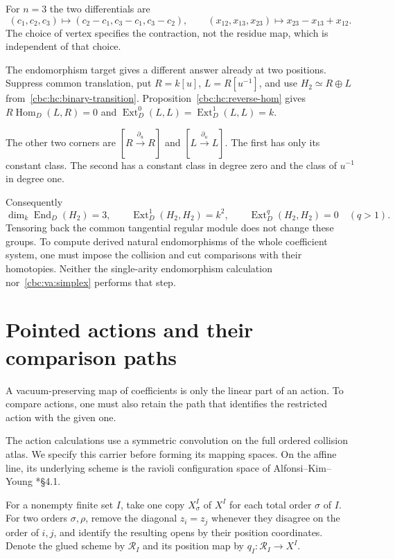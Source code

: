For $n=3$ the two differentials are
\[
 (c_1,c_2,c_3)\longmapsto(c_2-c_1,c_3-c_1,c_3-c_2),
 \qquad
 (x_{12},x_{13},x_{23})\longmapsto x_{23}-x_{13}+x_{12}.
\]
The choice of vertex specifies the contraction, not
the residue map, which is independent of that choice.

The endomorphism target gives a different answer already
at two positions. Suppress common translation, put
$R=k[u]$, $L=R[u^{-1}]$, and use
$H_2\simeq R\oplus L$ from~\eqref{cbc:hc:binary-transition}.
Proposition~\ref{cbc:hc:reverse-hom} gives
$R\operatorname{Hom}_D(L,R)=0$ and
$\operatorname{Ext}^0_D(L,L)=
\operatorname{Ext}^1_D(L,L)=k$.

The other two corners are $[R\xrightarrow{\partial_u}R]$
and $[L\xrightarrow{\partial_u}L]$.
The first has only its constant class. The second has
a constant class in degree zero and the class of $u^{-1}$
in degree one.

Consequently
\[
 \dim_k\operatorname{End}_D(H_2)=3,\qquad
 \operatorname{Ext}^1_D(H_2,H_2)=k^2,\qquad
 \operatorname{Ext}^{q}_D(H_2,H_2)=0\quad(q>1).
\]
Tensoring back the common tangential regular module
does not change these groups. To compute derived
natural endomorphisms of the whole coefficient system,
one must impose the collision and cut comparisons with
their homotopies. Neither the single-arity endomorphism
calculation nor~\eqref{cbc:va:simplex} performs that step.

\section{Pointed actions and their comparison paths}
\label{cbc:va:pointed}

A vacuum-preserving map of coefficients is only the
linear part of an action. To compare actions, one must
also retain the path that identifies the restricted
action with the given one.

The action calculations use a symmetric convolution
on the full ordered collision atlas. We specify this
carrier before forming its mapping spaces.
On the affine line, its underlying scheme is the
ravioli configuration space of Alfonsi--Kim--Young
\cite{AKY2024}*{\S4.1}.

For a nonempty finite set $I$, take one copy $X^I_\sigma$
of $X^I$ for each total order $\sigma$ of $I$.
For two orders $\sigma,\rho$, remove the diagonal
$z_i=z_j$ whenever they disagree on the order of $i,j$,
and identify the resulting opens by their position
coordinates. Denote the glued scheme by $\mathscr R_I$
and its position map by $q_I:\mathscr R_I\to X^I$.

